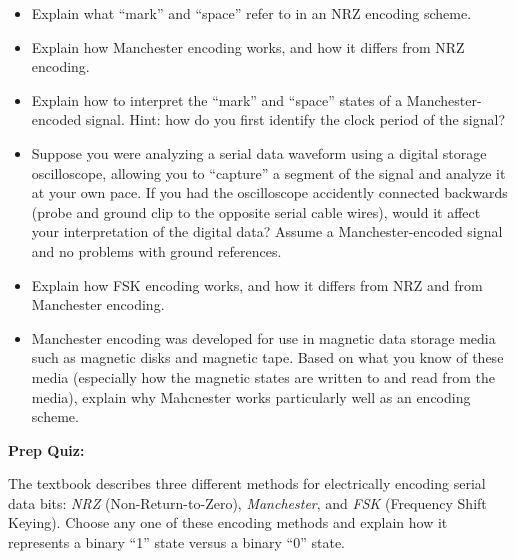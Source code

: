 \begin{itemize}
\item{} Explain what ``mark'' and ``space'' refer to in an NRZ encoding scheme.
\item{} Explain how Manchester encoding works, and how it differs from NRZ encoding.
\item{} Explain how to interpret the ``mark'' and ``space'' states of a Manchester-encoded signal.  Hint: how do you first identify the clock period of the signal?
\item{} Suppose you were analyzing a serial data waveform using a digital storage oscilloscope, allowing you to ``capture'' a segment of the signal and analyze it at your own pace.  If you had the oscilloscope accidently connected backwards (probe and ground clip to the opposite serial cable wires), would it affect your interpretation of the digital data?  Assume a Manchester-encoded signal and no problems with ground references.
\item{} Explain how FSK encoding works, and how it differs from NRZ and from Manchester encoding.
\item{} Manchester encoding was developed for use in magnetic data storage media such as magnetic disks and magnetic tape.  Based on what you know of these media (especially how the magnetic states are written to and read from the media), explain why Mahcnester works particularly well as an encoding scheme.
\end{itemize}












\vfil \eject

\noindent
{\bf Prep Quiz:}

The textbook describes three different methods for electrically encoding serial data bits: {\it NRZ} (Non-Return-to-Zero), {\it Manchester}, and {\it FSK} (Frequency Shift Keying).  Choose any one of these encoding methods and explain how it represents a binary ``1'' state versus a binary ``0'' state.





